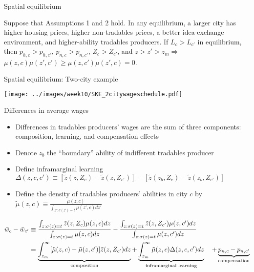 \documentclass[11pt,notes=hide,aspectratio=169]{beamer}
\begin{document}
\begin{frame}{Spatial equilibrium}
\begin{proposition} \label{prop:crosscitycharacteristics}
Suppose that Assumptions 1 and 2 hold. In any equilibrium, a larger city has higher housing prices, higher non-tradables prices, a better idea-exchange environment, and higher-ability tradables producers. If $L_c > L_{c'}$ in equilibrium, then $p_{h,c}>p_{h,c'}$, $p_{n,c}>p_{n,c'}$, $Z_c>Z_{c'}$, and $z>z'>z_m \Rightarrow$ $\mu(z,c)\mu(z',c')\geq\mu(z,c')\mu(z',c)=0$.
\end{proposition}
\end{frame}
\begin{frame}{Spatial equilibrium: Two-city example}
\begin{center}
\texttt{[image: ../images/week10/SKE\_2citywageschedule.pdf]}
\end{center}
\end{frame}
\begin{frame}{Differences in average wages}
\begin{itemize}
	\item Differences in tradables producers' wages are the sum of three components: composition, learning, and compensation effects
	\item Denote $z_b$ the ``boundary'' ability of indifferent tradables producer
	\item Define inframarginal learning $\Delta(z,c,c')\equiv\left[\tilde{z}(z,Z_{c})-\tilde{z}(z,Z_{c'})\right]-\left[\tilde{z}(z_{b},Z_{c})-\tilde{z}(z_{b},Z_{c'})\right]$
	\item Define the density of tradables producers' abilities in city $c$ by $\tilde{\mu}(z,c)\equiv\frac{\mu(z,c)}{\int_{z':\sigma(z')=t}\mu(z',c)dz'}$
\end{itemize}
\begin{align*}%
\bar{w}_{c}-\bar{w}_{c'} 
&
\equiv \frac{\int_{z:\sigma(z)=t}\tilde{z}(z,Z_{c})\mu(z,c)dz}{\int_{z:\sigma(z)=t}\mu(z,c)dz}-\frac{\int_{z:\sigma(z)=t}\tilde{z}(z,Z_{c'})\mu(z,c')dz}{\int_{z:\sigma(z)=t}\mu(z,c')dz} 
\\
& 
=\underbrace{\int_{z_m}^{\infty}[\tilde{\mu}(z,c)-\tilde{\mu}(z,c')]\tilde{z}(z,Z_{c'})dz}_{\textnormal{composition}} + \underbrace{\int_{z_m}^{\infty}\tilde{\mu}(z,c)\Delta(z,c,c')dz}_{\textnormal{inframarginal learning}} 
\quad +\underbrace{p_{n,c}-p_{n,c'}}_{\textnormal{compensation}}
\end{align*}
\end{frame}
\end{document}
